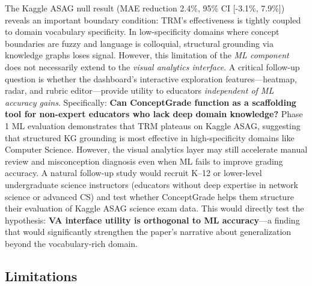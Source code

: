 \documentclass[journal,review]{vgtc}
\begin{document}
The Kaggle ASAG null result (MAE reduction 2.4\%, 95\% CI [-3.1\%, 7.9\%]) reveals an important boundary condition: TRM's effectiveness is tightly coupled to domain vocabulary specificity. In low-specificity domains where concept boundaries are fuzzy and language is colloquial, structural grounding via knowledge graphs loses signal. However, this limitation of the \textit{ML component} does not necessarily extend to the \textit{visual analytics interface}. A critical follow-up question is whether the dashboard's interactive exploration features---heatmap, radar, and rubric editor---provide utility to educators \textit{independent of ML accuracy gains}. Specifically: \textbf{Can ConceptGrade function as a scaffolding tool for non-expert educators who lack deep domain knowledge?} Phase 1 ML evaluation demonstrates that TRM plateaus on Kaggle ASAG, suggesting that structured KG grounding is most effective in high-specificity domains like Computer Science. However, the visual analytics layer may still accelerate manual review and misconception diagnosis even when ML fails to improve grading accuracy. A natural follow-up study would recruit K--12 or lower-level undergraduate science instructors (educators without deep expertise in network science or advanced CS) and test whether ConceptGrade helps them structure their evaluation of Kaggle ASAG science exam data. This would directly test the hypothesis: \textbf{VA interface utility is orthogonal to ML accuracy}---a finding that would significantly strengthen the paper's narrative about generalization beyond the vocabulary-rich domain.

\subsection{Limitations}
\label{subsec:confounding}
\end{document}

